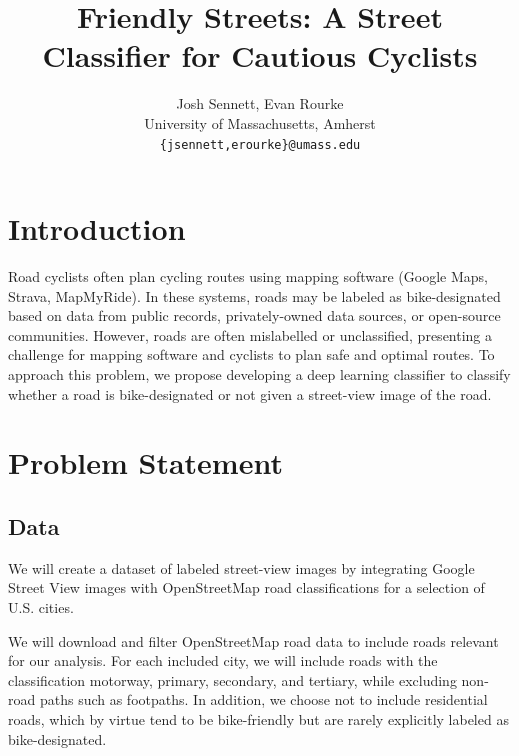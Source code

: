 \documentclass[10pt,twocolumn,letterpaper]{article}
\begin{document}
\title{Friendly Streets: A Street Classifier for Cautious Cyclists}

\author{Josh Sennett, Evan Rourke\\
University of Massachusetts, Amherst\\
{\tt\small \{jsennett,erourke\}@umass.edu}
}

\maketitle



\section{Introduction}

Road cyclists often plan cycling routes using mapping software (Google Maps, Strava, MapMyRide). In these systems, roads may be labeled as bike-designated based on data from public records, privately-owned data sources, or open-source communities. However, roads are often mislabelled or unclassified, presenting a challenge for mapping software and cyclists to plan safe and optimal routes. To approach this problem, we propose developing a deep learning classifier to classify whether a road is bike-designated or not given a street-view image of the road. 

\section{Problem Statement}

\subsection{Data}

We will create a dataset of labeled street-view images by integrating Google Street View images with OpenStreetMap road classifications for a selection of U.S. cities. 

We will download and filter OpenStreetMap road data to include roads relevant for our analysis. For each included city, we will include roads with the classification motorway, primary, secondary, and tertiary, while excluding non-road paths such as footpaths. In addition, we choose not to include residential roads, which by virtue tend to be bike-friendly but are rarely explicitly labeled as bike-designated.
\end{document}
